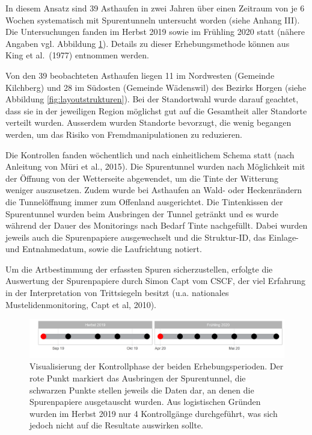 \documentclass[
  oneside]{scrbook}
\begin{document}
In diesem Ansatz sind 39 Asthaufen in zwei Jahren über einen Zeitraum von je 6 Wochen systematisch mit Spurentunneln untersucht worden (siehe Anhang III). Die Untersuchungen fanden im Herbst 2019 sowie im Frühling 2020 statt (nähere Angaben vgl. Abbildung \ref{fig:erhebungswoche}). Details zu dieser Erhebungsmethode können aus King et al.~(1977) entnommen werden.

Von den 39 beobachteten Asthaufen liegen 11 im Nordwesten (Gemeinde Kilchberg) und 28 im Südosten (Gemeinde Wädenswil) des Bezirks Horgen (siehe Abbildung \ref{fig:layoutstrukturen}). Bei der Standortwahl wurde darauf geachtet, dass sie in der jeweiligen Region möglichst gut auf die Gesamtheit aller Standorte verteilt wurden. Ausserdem wurden Standorte bevorzugt, die wenig begangen werden, um das Risiko von Fremdmanipulationen zu reduzieren.

Die Kontrollen fanden wöchentlich und nach einheitlichem Schema statt (nach Anleitung von Müri et al., 2015). Die Spurentunnel wurden nach Möglichkeit mit der Öffnung von der Wetterseite abgewendet, um die Tinte der Witterung weniger auszusetzen. Zudem wurde bei Asthaufen an Wald- oder Heckenrändern die Tunnelöffnung immer zum Offenland ausgerichtet. Die Tintenkissen der Spurentunnel wurden beim Ausbringen der Tunnel getränkt und es wurde während der Dauer des Monitorings nach Bedarf Tinte nachgefüllt. Dabei wurden jeweils auch die Spurenpapiere ausgewechselt und die Struktur-ID, das Einlage- und Entnahmedatum, sowie die Laufrichtung notiert.

Um die Artbestimmung der erfassten Spuren sicherzustellen, erfolgte die Auswertung der Spurenpapiere durch Simon Capt vom CSCF, der viel Erfahrung in der Interpretation von Trittsiegeln besitzt (u.a. nationales Mustelidenmonitoring, Capt et al, 2010).



\begin{figure}
\includegraphics[width=1\linewidth]{images/Erhebungswochen} \caption{Visualisierung der Kontrollphase der beiden Erhebungsperioden. Der rote Punkt markiert das Ausbringen der Spurentunnel, die schwarzen Punkte stellen jeweils die Daten dar, an denen die Spurenpapiere ausgetauscht wurden. Aus logistischen Gründen wurden im Herbst 2019 nur 4 Kontrollgänge durchgeführt, was sich jedoch nicht auf die Resultate auswirken sollte.}\label{fig:erhebungswoche}
\end{figure}
\end{document}
